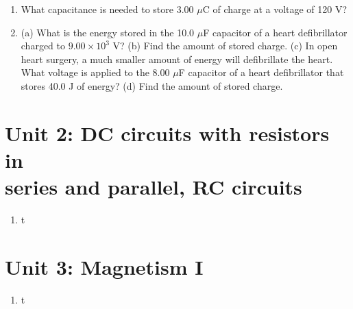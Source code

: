 \documentclass[12pt,twocolumn]{article}
\begin{document}
\noindent
\begin{enumerate}
\item What capacitance is needed to store 3.00 $\mu$C of charge at a voltage of 120 V? \\ \vspace{2cm}
\item (a) What is the energy stored in the 10.0 $\mu$F capacitor of a heart defibrillator charged to $9.00\times 10^3$ V? (b) Find the amount of stored charge. (c) In open heart surgery, a much smaller amount of energy will defibrillate the heart.  What voltage is applied to the 8.00 $\mu$F capacitor of a heart defibrillator that stores 40.0 J of energy? (d) Find the amount of stored charge. \\ \vspace{5cm}
\end{enumerate}

\section{Unit 2: DC circuits with resistors in \\ series and parallel, RC circuits}

\noindent
\begin{enumerate}
\item t
\end{enumerate}

\section{Unit 3: Magnetism I}

\noindent
\begin{enumerate}
\item t
\end{enumerate}
\end{document}
